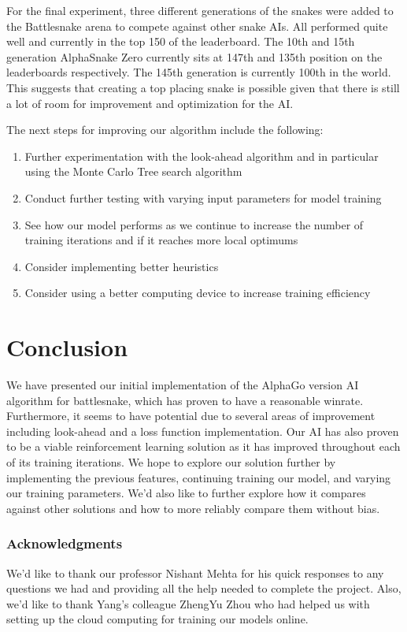 ﻿\documentclass{article}
\begin{document}
For the final experiment, three different generations of the snakes were added
to the Battlesnake arena to compete against other snake AIs. All performed quite
well and currently in the top 150 of the leaderboard. The 10th and 15th
generation AlphaSnake Zero currently sits at 147th and 135th position on the
leaderboards respectively. The 145th generation is currently 100th in the world.
This suggests that creating a top placing snake is possible given that there is
still a lot of room for improvement and optimization for the AI.

The next steps for improving our algorithm include the following:

\begin{enumerate}
  \item Further experimentation with the look-ahead algorithm and in particular
        using the Monte Carlo Tree search algorithm
  \item Conduct further testing with varying input parameters for model training
  \item See how our model performs as we continue to increase the number of
        training iterations and if it reaches more local optimums
  \item Consider implementing better heuristics
  \item Consider using a better computing device to increase training efficiency
\end{enumerate}

\section{Conclusion}

We have presented our initial implementation of the AlphaGo version AI algorithm
for battlesnake, which has proven to have a reasonable winrate. Furthermore, it
seems to have potential due to several areas of improvement including look-ahead
and a loss function implementation. Our AI has also proven to be a viable
reinforcement learning solution as it has improved throughout each of its
training iterations. We hope to explore our solution further by implementing the
previous features, continuing training our model, and varying our training
parameters. We'd also like to further explore how it compares against other
solutions and how to more reliably compare them without bias.

\subsubsection*{Acknowledgments}

We'd like to thank our professor Nishant Mehta for his quick responses to any
questions we had and providing all the help needed to complete the project.
Also, we'd like to thank Yang's colleague ZhengYu Zhou who had helped us with
setting up the cloud computing for training our models online.

\newpage

\small


% 


\end{document}

